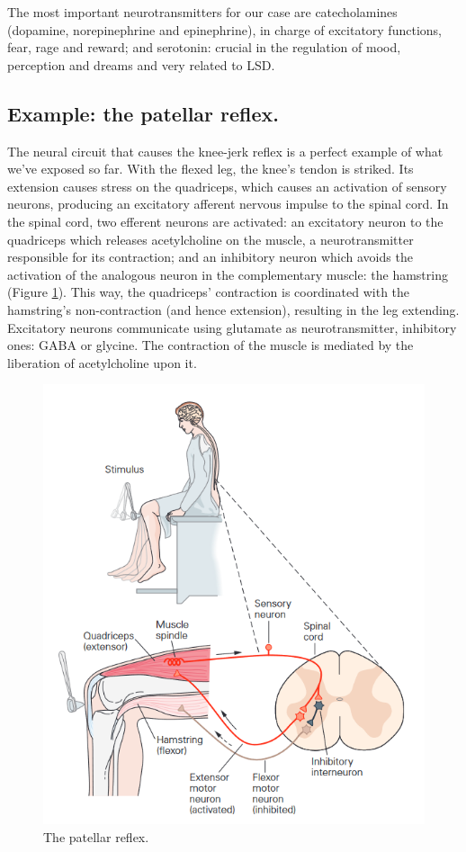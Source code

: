 The most important neurotransmitters for our case are catecholamines (dopamine, norepinephrine and epinephrine), in charge of excitatory functions, fear, rage and reward; and serotonin: crucial in the regulation of mood, perception and dreams and very related to LSD.

\subsection{Example: the patellar reflex.}

The neural circuit that causes the knee-jerk reflex is a perfect example of what we've exposed so far. With the flexed leg, the knee's tendon is striked. Its extension causes stress on the quadriceps, which causes an activation of sensory neurons, producing an excitatory afferent nervous impulse to the spinal cord. In the spinal cord, two efferent neurons are activated: an excitatory neuron to the quadriceps which releases acetylcholine on the muscle, a neurotransmitter responsible for its contraction; and an inhibitory neuron which avoids the activation of the analogous neuron in the complementary muscle: the hamstring (Figure \ref{sn}). This way, the quadriceps' contraction is coordinated with the hamstring's non-contraction (and hence extension), resulting in the leg extending. Excitatory neurons communicate using glutamate as neurotransmitter, inhibitory ones: GABA or glycine. The contraction of the muscle is mediated by the liberation of acetylcholine upon it.

\begin{figure}[H]
	\centering
	\includegraphics[width=.8\linewidth]{media/7-sn.png}
	\caption{The patellar reflex.}
	\label{sn}
\end{figure}

